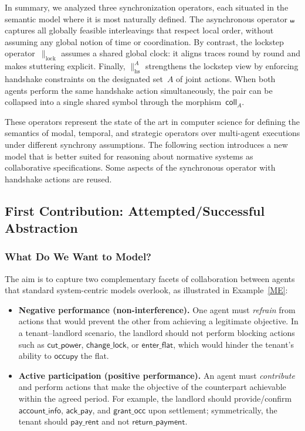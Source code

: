 \documentclass{article}
\begin{document}
  
  In summary, we analyzed three synchronization operators, each situated in the semantic model where it is most naturally defined. 
  The asynchronous operator $\shuffle$ captures all globally feasible interleavings that respect local order, without assuming any global notion of time or coordination. 
  By contrast, the lockstep operator~$\parallel_{\mathrm{lock}}$ assumes a shared global clock: it aligns traces round by round and makes stuttering explicit. 
  Finally, $\parallel_{\mathrm{hs}}^{A}$ strengthens the lockstep view by enforcing handshake constraints on the designated set~$A$ of joint actions. 
  When both agents perform the same handshake action simultaneously, the pair can be collapsed into a single shared symbol through the morphism~$\mathsf{coll}_A$.
  
  
  These operators represent the state of the art in computer science for defining the semantics of modal, temporal, and strategic operators over multi-agent executions under different synchrony assumptions. The following section introduces a new model that is better suited for reasoning about normative systems as collaborative specifications. Some aspects of the synchronous operator with handshake actions are reused.
  
  
  \subsection{First Contribution: Attempted/Successful Abstraction}
  \subsubsection{What Do We Want to Model?}
  \label{subsec:what-to-model}
  
  The aim is to capture two complementary facets of collaboration between agents that standard system-centric models overlook, as illustrated in Example~\ref{ME}:
  
  \begin{itemize}
    \item \textbf{Negative performance (non-interference).}
    One agent must \emph{refrain} from actions that would prevent the other from achieving a legitimate objective.
    In a tenant--landlord scenario, the landlord should not perform blocking actions such as
    \(\textsf{cut\_power}\), \(\textsf{change\_lock}\), or \(\textsf{enter\_flat}\), which would hinder the tenant’s ability to \(\textsf{occupy}\) the flat.
  
    \item \textbf{Active participation (positive performance).}
  An agent must \emph{contribute} and perform actions that make the objective of the counterpart achievable within the agreed period.
    For example, the landlord should provide/confirm \(\textsf{account\_info}\), \(\textsf{ack\_pay}\), and \(\textsf{grant\_occ}\) upon settlement; symmetrically, the tenant should \(\textsf{pay\_rent}\) and not \(\textsf{return\_payment}\).
  \end{itemize}
  
\end{document}
